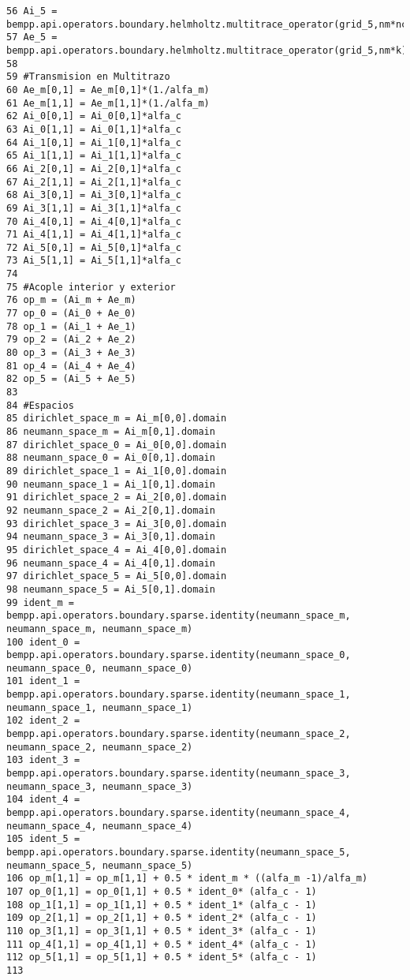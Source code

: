 \documentclass[12pt,letterpaper]{report}
\numberwithin{equation}{section}
\begin{document}
\begin{lstlisting}
56 Ai_5 = bempp.api.operators.boundary.helmholtz.multitrace_operator(grid_5,nm*nc*k)
57 Ae_5 = bempp.api.operators.boundary.helmholtz.multitrace_operator(grid_5,nm*k)
58 
59 #Transmision en Multitrazo
60 Ae_m[0,1] = Ae_m[0,1]*(1./alfa_m)
61 Ae_m[1,1] = Ae_m[1,1]*(1./alfa_m)
62 Ai_0[0,1] = Ai_0[0,1]*alfa_c
63 Ai_0[1,1] = Ai_0[1,1]*alfa_c
64 Ai_1[0,1] = Ai_1[0,1]*alfa_c
65 Ai_1[1,1] = Ai_1[1,1]*alfa_c
66 Ai_2[0,1] = Ai_2[0,1]*alfa_c
67 Ai_2[1,1] = Ai_2[1,1]*alfa_c
68 Ai_3[0,1] = Ai_3[0,1]*alfa_c
69 Ai_3[1,1] = Ai_3[1,1]*alfa_c
70 Ai_4[0,1] = Ai_4[0,1]*alfa_c
71 Ai_4[1,1] = Ai_4[1,1]*alfa_c
72 Ai_5[0,1] = Ai_5[0,1]*alfa_c
73 Ai_5[1,1] = Ai_5[1,1]*alfa_c
74 
75 #Acople interior y exterior
76 op_m = (Ai_m + Ae_m)
77 op_0 = (Ai_0 + Ae_0)
78 op_1 = (Ai_1 + Ae_1)
79 op_2 = (Ai_2 + Ae_2)
80 op_3 = (Ai_3 + Ae_3)
81 op_4 = (Ai_4 + Ae_4)
82 op_5 = (Ai_5 + Ae_5)
83 
84 #Espacios
85 dirichlet_space_m = Ai_m[0,0].domain
86 neumann_space_m = Ai_m[0,1].domain
87 dirichlet_space_0 = Ai_0[0,0].domain
88 neumann_space_0 = Ai_0[0,1].domain
89 dirichlet_space_1 = Ai_1[0,0].domain
90 neumann_space_1 = Ai_1[0,1].domain
91 dirichlet_space_2 = Ai_2[0,0].domain
92 neumann_space_2 = Ai_2[0,1].domain
93 dirichlet_space_3 = Ai_3[0,0].domain
94 neumann_space_3 = Ai_3[0,1].domain
95 dirichlet_space_4 = Ai_4[0,0].domain
96 neumann_space_4 = Ai_4[0,1].domain
97 dirichlet_space_5 = Ai_5[0,0].domain
98 neumann_space_5 = Ai_5[0,1].domain
99 ident_m = bempp.api.operators.boundary.sparse.identity(neumann_space_m, neumann_space_m, neumann_space_m)
100 ident_0 = bempp.api.operators.boundary.sparse.identity(neumann_space_0, neumann_space_0, neumann_space_0)
101 ident_1 = bempp.api.operators.boundary.sparse.identity(neumann_space_1, neumann_space_1, neumann_space_1)
102 ident_2 = bempp.api.operators.boundary.sparse.identity(neumann_space_2, neumann_space_2, neumann_space_2)
103 ident_3 = bempp.api.operators.boundary.sparse.identity(neumann_space_3, neumann_space_3, neumann_space_3)
104 ident_4 = bempp.api.operators.boundary.sparse.identity(neumann_space_4, neumann_space_4, neumann_space_4)
105 ident_5 = bempp.api.operators.boundary.sparse.identity(neumann_space_5, neumann_space_5, neumann_space_5)
106 op_m[1,1] = op_m[1,1] + 0.5 * ident_m * ((alfa_m -1)/alfa_m)
107 op_0[1,1] = op_0[1,1] + 0.5 * ident_0* (alfa_c - 1)
108 op_1[1,1] = op_1[1,1] + 0.5 * ident_1* (alfa_c - 1)
109 op_2[1,1] = op_2[1,1] + 0.5 * ident_2* (alfa_c - 1)
110 op_3[1,1] = op_3[1,1] + 0.5 * ident_3* (alfa_c - 1)
111 op_4[1,1] = op_4[1,1] + 0.5 * ident_4* (alfa_c - 1)
112 op_5[1,1] = op_5[1,1] + 0.5 * ident_5* (alfa_c - 1)
113 

\end{lstlisting}
\end{document}
